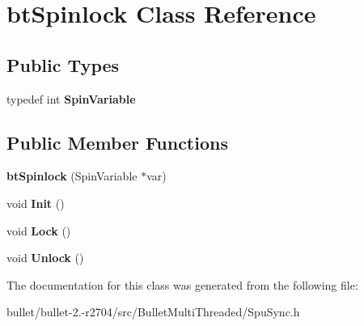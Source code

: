 \hypertarget{classbt_spinlock}{\section{bt\+Spinlock Class Reference}
\label{classbt_spinlock}
}
\subsection*{Public Types}
\begin{DoxyCompactItemize}
\item 
\hypertarget{classbt_spinlock_afaa3c962dd67a0e6ab713fc6f1df0a36}{typedef int {\bfseries Spin\+Variable}}\label{classbt_spinlock_afaa3c962dd67a0e6ab713fc6f1df0a36}

\end{DoxyCompactItemize}
\subsection*{Public Member Functions}
\begin{DoxyCompactItemize}
\item 
\hypertarget{classbt_spinlock_a2248925eeb85d51a353b99af2f410c99}{{\bfseries bt\+Spinlock} (Spin\+Variable $\ast$var)}\label{classbt_spinlock_a2248925eeb85d51a353b99af2f410c99}

\item 
\hypertarget{classbt_spinlock_af7cda5ac60df4e98cc1572a9333e9f46}{void {\bfseries Init} ()}\label{classbt_spinlock_af7cda5ac60df4e98cc1572a9333e9f46}

\item 
\hypertarget{classbt_spinlock_ae3b7b9127f93474665fb1b67f11cab41}{void {\bfseries Lock} ()}\label{classbt_spinlock_ae3b7b9127f93474665fb1b67f11cab41}

\item 
\hypertarget{classbt_spinlock_a0d25638d58c7fac3cd768098f7c69ab9}{void {\bfseries Unlock} ()}\label{classbt_spinlock_a0d25638d58c7fac3cd768098f7c69ab9}

\end{DoxyCompactItemize}


The documentation for this class was generated from the following file\+:\begin{DoxyCompactItemize}
\item 
bullet/bullet-\/2.-\/r2704/src/\+Bullet\+Multi\+Threaded/Spu\+Sync.\+h\end{DoxyCompactItemize}
